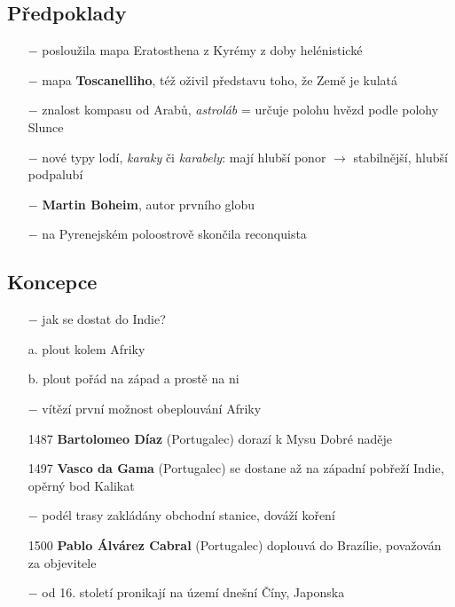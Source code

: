 \documentclass{article}
\begin{document}
\subsection*{Předpoklady}
\begin{itemize}
    \vspace{-0.5em}
    \setlength\itemsep{0.15em}
    \item[$-$] posloužila mapa Eratosthena z Kyrémy z doby helénistické
    \item[$-$] mapa \textbf{Toscanelliho}, též oživil představu toho, že Země je kulatá
    \item[$-$] znalost kompasu od Arabů, \textit{astroláb} = určuje polohu hvězd podle polohy Slunce
    \item[$-$] nové typy lodí, \textit{karaky} či \textit{karabely}: mají hlubší ponor $\rightarrow$ stabilnější, hlubší podpalubí
    \item[$-$] \textbf{Martin Boheim}, autor prvního globu
    \item[$-$] na Pyrenejském poloostrově skončila reconquista
\end{itemize}

\subsection*{Koncepce}
\begin{itemize}
    \vspace{-0.5em}
    \setlength\itemsep{0.15em}
    \item[$-$] jak se dostat do Indie?
    \item[a.] plout kolem Afriky
    \item[b.] plout pořád na západ a prostě na ni 
    \item[$-$] vítězí první možnost obeplouvání Afriky
    \item[1487] \textbf{Bartolomeo Díaz} (Portugalec) dorazí k Mysu Dobré naděje
    \item[1497] \textbf{Vasco da Gama} (Portugalec) se dostane až na západní pobřeží Indie, opěrný bod Kalikat
    \item[$-$] podél trasy zakládány obchodní stanice, dováží koření
    \item[1500] \textbf{Pablo Álvárez Cabral} (Portugalec) doplouvá do Brazílie, považován za objevitele
    \item[$-$] od 16. století pronikají na území dnešní Číny, Japonska
\end{itemize}
\end{document}
